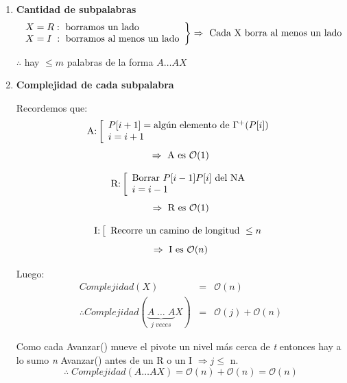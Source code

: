 \documentclass[12pt,a4paper]{report}
\begin{document}
			\begin{enumerate}
				\item \textbf{Cantidad de subpalabras}
					\begin{equation*}
						\left.
						\begin{array}{l}
							X = R: \textup{ borramos un lado} \\
							X = I \; : \textup{ borramos al menos un lado}
						\end{array}
						\right\rbrace
						\Rightarrow \textup{ Cada X borra al menos un lado}
					\end{equation*}
					\begin{center}
						$\therefore$ hay $\leq m$ palabras de la forma $A \dotsc A X$
					\end{center}
				\item \textbf{Complejidad de cada subpalabra}
					\par Recordemos que:
					\begin{equation*}
						\textup{A:}
						\left[
						\begin{array}{l}
							P[i + 1] = \textup{algún elemento de } \Gamma^{+}(P[i]) \\
							i = i + 1
						\end{array}
						\right.
					\end{equation*}
					\[ \Rightarrow \textup{ A es } \mathcal{O}(1) \]

					\begin{equation*}
						\textup{R:}
						\left[
						\begin{array}{l}
							\textup{Borrar } P[i - 1]P[i] \textup{ del NA} \\
							i = i - 1
						\end{array}
						\right.
					\end{equation*}
					\[ \Rightarrow \textup{ R es } \mathcal{O}(1) \]

					\begin{equation*}
						\textup{I:}
						\left[
						\begin{array}{l}
							\textup{Recorre un camino de longitud } \leq n
						\end{array}
						\right.
					\end{equation*}
					\[ \Rightarrow \textup{ I es } \mathcal{O}(n) \]

					\par Luego:
					\begin{eqnarray}
						\nonumber Complejidad(X) &=& \mathcal{O}(n) \\
						\nonumber \therefore Complejidad (\underbrace{A \; \dotsc \; A}_{j \; veces}X) &=&\mathcal{O}(j) + \mathcal{O}(n)
					\end{eqnarray}

					\par Como cada Avanzar() mueve el pivote un nivel más cerca de \textit{t} entonces hay a lo sumo \textit{n} Avanzar() antes de un R o un I $\Rightarrow j\leq$ n.
					\[ \therefore \; Complejidad(A \dotsc AX) = \mathcal{O}(n) + \mathcal{O}(n) = \mathcal{O}(n)\]
			\end{enumerate}
\end{document}
